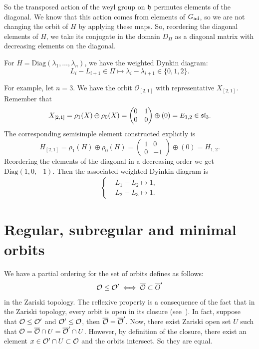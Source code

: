 So the transposed action of the weyl group on $\mathfrak{h}$ permutes elements of the diagonal. We know that this action comes 
from elements of $G_{\text{ad}}$, so we are not changing the orbit of $H$ by applying these maps. So, reordering the diagonal elements 
of $H$, we take its conjugate in the domain $D_\Pi$ as a diagonal matrix with decreasing elements on the diagonal.

For $H=\text{Diag}(\lambda_1,\dots,\lambda_n)$, we have the weighted Dynkin diagram:
\begin{equation}
    L_i-L_{i+1} \in\Pi\mapsto \lambda_i-\lambda_{i+1}\in\{0,1,2\}.
\end{equation}

For example, let $n=3$. We have the orbit $\mathcal{O}_{[2,1]}$ with representative $X_{[2,1]}$. Remember that 
\begin{equation}
    X_{[2,1]}=\rho_1(X)\oplus\rho_0(X)=\begin{pmatrix}0&1\\0&0\end{pmatrix}\oplus(0)=E_{1,2}\in\mathfrak{sl}_3.
\end{equation}
The corresponding semisimple element constructed explictly is 
\begin{equation}
    H_{[2,1]}=\rho_1(H)\oplus\rho_0(H)=\begin{pmatrix}1&0\\0&-1\end{pmatrix}\oplus(0)=H_{1,2}.
\end{equation}
Reordering the elements of the diagonal in a decreasing order we get 
$\text{Diag}(1,0,-1)$. Then the associated weighted Dyinkin diagram is
\begin{align*}
    \left\{\begin{aligned}
        &L_1-L_2\mapsto 1,\\
        &L_2-L_3\mapsto 1.
    \end{aligned}\right.
\end{align*}


\section{Regular, subregular and minimal orbits}
We have a partial ordering for the set of orbits defines as follows:
\begin{equation}
    \mathcal{O}\leq \mathcal{O}^\prime \iff \overline{\mathcal{O}}\subset \overline{O}^\prime
\end{equation}
in the Zariski topology. The reflexive property is a consequence of the fact that in the Zariski topology, every
orbit is open in its closure (see~\cite{collingwood2017nilpotent}). In fact, suppose that 
$\mathcal{O} \leq \mathcal{O}^\prime$ and $\mathcal{O}^\prime\leq \mathcal{O}$, then $\overline{\mathcal{O}}=\overline{\mathcal{O}}^\prime$. Now, there exist 
Zariski open set $U$ such that $\mathcal{O}=\overline{\mathcal{O}}\cap U=\overline{\mathcal{O}}^\prime\cap U$. However, 
by definition of the closure, there exist an element $x\in \mathcal{O}^\prime\cap U \subset \mathcal{O}$ and the orbits intersect. So they 
are equal.

